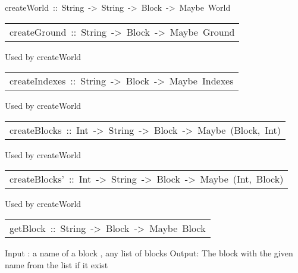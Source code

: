 \begin{haddockdesc}
\item[
createWorld\ ::\ {\char 91}{\char 91}String{\char 93}{\char 93}\ ->\ String\ ->\ {\char 91}Block{\char 93}\ ->\ Maybe\ World
]
\end{haddockdesc}
\begin{haddockdesc}
\item[\begin{tabular}{@{}l}
createGround\ ::\ {\char 91}{\char 91}String{\char 93}{\char 93}\ ->\ {\char 91}Block{\char 93}\ ->\ Maybe\ Ground
\end{tabular}]\haddockbegindoc
Used by createWorld
\par

\end{haddockdesc}
\begin{haddockdesc}
\item[\begin{tabular}{@{}l}
createIndexes\ ::\ {\char 91}{\char 91}String{\char 93}{\char 93}\ ->\ {\char 91}Block{\char 93}\ ->\ Maybe\ Indexes
\end{tabular}]\haddockbegindoc
Used by createWorld
\par

\end{haddockdesc}
\begin{haddockdesc}
\item[\begin{tabular}{@{}l}
createBlocks\ ::\ Int\ ->\ {\char 91}String{\char 93}\ ->\ {\char 91}Block{\char 93}\ ->\ Maybe\ {\char 91}(Block,\ Int){\char 93}
\end{tabular}]\haddockbegindoc
Used by createWorld
\par

\end{haddockdesc}
\begin{haddockdesc}
\item[\begin{tabular}{@{}l}
createBlocks'\ ::\ Int\ ->\ {\char 91}String{\char 93}\ ->\ {\char 91}Block{\char 93}\ ->\ Maybe\ (Int,\ {\char 91}Block{\char 93})
\end{tabular}]\haddockbegindoc
Used by createWorld
\par

\end{haddockdesc}
\begin{haddockdesc}
\item[\begin{tabular}{@{}l}
getBlock\ ::\ String\ ->\ {\char 91}Block{\char 93}\ ->\ Maybe\ Block
\end{tabular}]\haddockbegindoc
Input : a name of a block , any list of blocks
  Output: The block with the given name from the list if it exist
\par

\end{haddockdesc}
